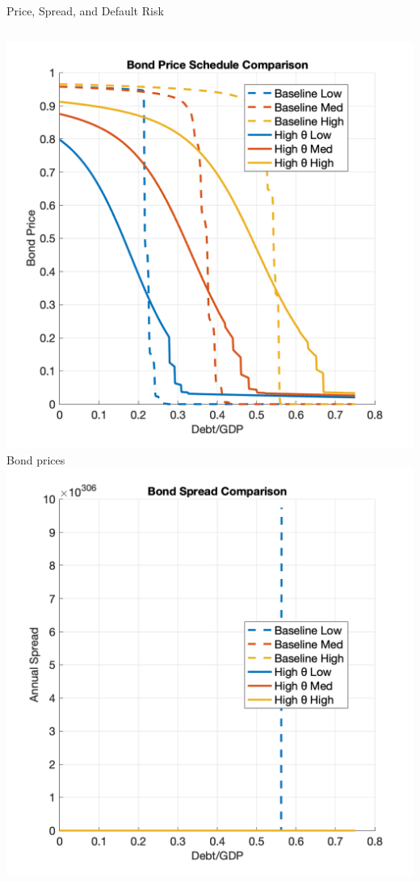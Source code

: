 \documentclass[aspectratio=169,11pt,professionalfonts]{beamer}
\newcommand{\1}{\mathbb{1}}
\begin{document}
\begin{frame}{Price, Spread, and Default Risk}
  \begin{columns}[T,onlytextwidth]
    \includegraphics[width=\linewidth]{../../pro-default-model/results/bond_price_comparison.png}\\[0.3em]
    {\scriptsize Bond prices}
    \includegraphics[width=\linewidth]{../../pro-default-model/results/spread_comparison.png}\\[0.3em]

\end{columns}
\end{frame}
\end{document}

